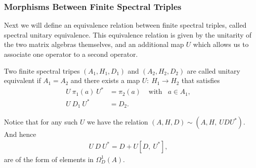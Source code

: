 \subsubsection{Morphisms Between Finite Spectral Triples}
Next we will define an equivalence relation between finite spectral triples, called
spectral unitary equivalence. This equivalence relation is given by the unitarity of the
two matrix algebras themselves, and an additional map $U$ which allows us to associate
one operator to a second operator.
\begin{mydefinition}
    Two finite spectral tripes $(A_1, H_1, D_1)$ and $(A_2, H_2, D_2)$ are
    called unitary equivalent if $A_1 = A_2$ and there exists a map $U:\ H_1
    \rightarrow H_2$ that satisfies
    \begin{align}
        U\ \pi_1(a)\ U^* &= \pi_2(a)\;\;\;\; \text{with} \;\;\; a \in A_1,\\
        U\ D_1\ U^* &= D_2.
    \end{align}
\end{mydefinition}
Notice that for any such $U$ we have the relation $(A, H, D) \sim (A, H,\ UDU^*)$.
And hence
\begin{align}
    U\ D\ U^* = D + U[D,\ U^*],
\end{align}
are of the form of elements in $\Omega _D^1 (A)$.

